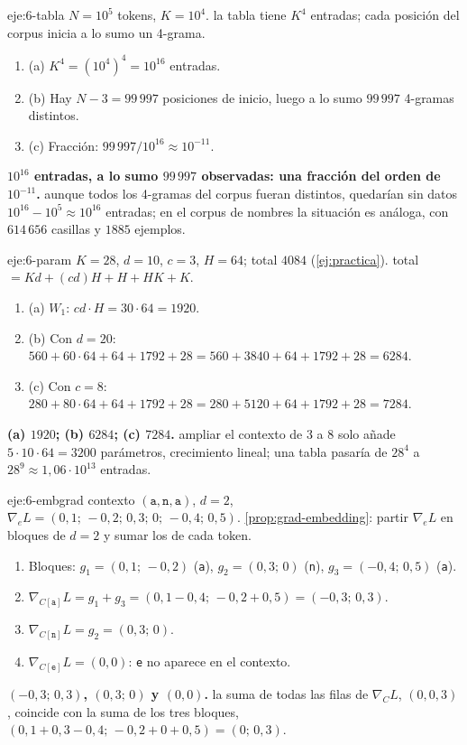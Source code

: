 \begin{solucion}{eje:6-tabla}
\datos $N=10^{5}$ tokens, $K=10^{4}$.
\planteamiento la tabla tiene $K^{4}$ entradas; cada posición del corpus inicia a lo sumo un 4-grama.
\pasos
\begin{enumerate}[label=\arabic*.]
  \item (a) $K^{4}=(10^{4})^{4}=10^{16}$ entradas.
  \item (b) Hay $N-3=99\,997$ posiciones de inicio, luego a lo sumo $99\,997$ 4-gramas distintos.
  \item (c) Fracción: $99\,997/10^{16}\approx 10^{-11}$.
\end{enumerate}
\resultado \textbf{$10^{16}$ entradas, a lo sumo $99\,997$ observadas: una fracción del orden de $10^{-11}$.}
\comprobacion aunque todos los 4-gramas del corpus fueran distintos, quedarían sin datos $10^{16}-10^{5}\approx 10^{16}$ entradas; en el corpus de nombres la situación es análoga, con $614\,656$ casillas y $1885$ ejemplos.
\end{solucion}

\begin{solucion}{eje:6-param}
\datos $K=28$, $d=10$, $c=3$, $H=64$; total $4084$ (\cref{ej:practica}).
\planteamiento total $=Kd+(cd)H+H+HK+K$.
\pasos
\begin{enumerate}[label=\arabic*.]
  \item (a) $W_1$: $cd\cdot H=30\cdot 64=1920$.
  \item (b) Con $d=20$: $560+60\cdot 64+64+1792+28=560+3840+64+1792+28=6284$.
  \item (c) Con $c=8$: $280+80\cdot 64+64+1792+28=280+5120+64+1792+28=7284$.
\end{enumerate}
\resultado \textbf{(a) $1920$; (b) $6284$; (c) $7284$.}
\comprobacion ampliar el contexto de 3 a 8 solo añade $5\cdot 10\cdot 64=3200$ parámetros, crecimiento lineal; una tabla pasaría de $28^{4}$ a $28^{9}\approx 1{,}06\cdot 10^{13}$ entradas.
\end{solucion}

\begin{solucion}{eje:6-embgrad}
\datos contexto $(\texttt{a},\texttt{n},\texttt{a})$, $d=2$, $\nabla_{\!e}L=(0{,}1;\,-0{,}2;\,0{,}3;\,0;\,-0{,}4;\,0{,}5)$.
\planteamiento \cref{prop:grad-embedding}: partir $\nabla_{\!e}L$ en bloques de $d=2$ y sumar los de cada token.
\pasos
\begin{enumerate}[label=\arabic*.]
  \item Bloques: $g_1=(0{,}1;\,-0{,}2)$ (\texttt{a}), $g_2=(0{,}3;\,0)$ (\texttt{n}), $g_3=(-0{,}4;\,0{,}5)$ (\texttt{a}).
  \item $\nabla_{\!C[\texttt{a}]}L=g_1+g_3=(0{,}1-0{,}4;\,-0{,}2+0{,}5)=(-0{,}3;\,0{,}3)$.
  \item $\nabla_{\!C[\texttt{n}]}L=g_2=(0{,}3;\,0)$.
  \item $\nabla_{\!C[\texttt{e}]}L=(0,0)$: \texttt{e} no aparece en el contexto.
\end{enumerate}
\resultado \textbf{$(-0{,}3;\,0{,}3)$, $(0{,}3;\,0)$ y $(0,0)$.}
\comprobacion la suma de todas las filas de $\nabla_{\!C}L$, $(0,0{,}3)$, coincide con la suma de los tres bloques, $(0{,}1+0{,}3-0{,}4;\,-0{,}2+0+0{,}5)=(0;\,0{,}3)$.
\end{solucion}

